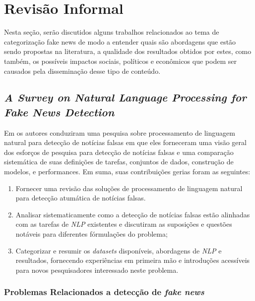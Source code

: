 \section{Revisão Informal}

Nesta seção, serão discutidos alguns trabalhos relacionados ao tema de
categorização fake news de modo a entender quais são abordagens que estão sendo
propostas na literatura, a qualidade dos resultados obtidos por estes, como também, os possíveis impactos sociais, políticos e econômicos que podem ser causados pela disseminação desse tipo de conteúdo.

\subsection{\textit{A Survey on Natural Language Processing for Fake News Detection}}

Em \cite{oshikawa2020} os autores conduziram uma pesquisa sobre processamento de linguagem natural para detecção de notícias falsas em que eles forneceram uma visão geral dos esforços de pesquisa para detecção de notícias falsas e uma comparação sistemática de suas definições de tarefas, conjuntos de dados, construção de modelos, e performances. Em suma, suas contribuições gerias foram as seguintes: \\

\begin{enumerate}
    \item Fornecer uma revisão das soluções de processamento de linguagem natural para detecção atumática de notícias falsas.
    
    \item Analisar sistematicamente como a detecção de notícias falsas estão alinhadas com as tarefas de \textit{NLP} existentes e discutiram as suposições e questões notáveis para diferentes fórmulações do problema;
    
    \item Categorizar e resumir os \textit{datasets} disponíveis, abordagens de \textit{NLP} e resultados, fornecendo experiências em primeira mão e introduções acessíveis para novos pesquisadores interessado neste problema.
\end{enumerate}

\subsubsection{Problemas Relacionados a detecção de \textit{fake news}}

